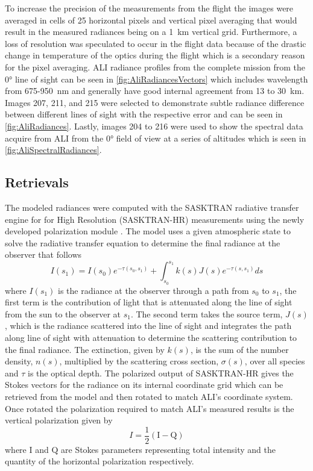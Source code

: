 \documentclass[12pt]{article}
\begin{document}
To increase the precision of the measurements from the flight the images were averaged in cells of 25 horizontal pixels and vertical pixel averaging that would result in the measured radiances being on a 1~km vertical grid. Furthermore, a loss of resolution was speculated to occur in the flight data because of the drastic change in temperature of the optics during the flight which is a secondary reason for the pixel averaging. ALI radiance profiles from the complete mission from the 0\si{\degree} line of sight can be seen in \autoref{fig:AliRadiancesVectors} which includes wavelength from 675-950~nm and generally have good internal agreement from 13 to 30~km. Images 207, 211, and 215 were selected to demonstrate subtle radiance difference between different lines of sight with the respective error and can be seen in \autoref{fig:AliRadiances}. Lastly, images 204 to 216 were used to show the spectral data acquire from ALI from the 0\si{\degree} field of view at a series of altitudes which is seen in \autoref{fig:AliSpectralRadiances}.

\subsection{Retrievals}
\label{sec:retrievals}

The modeled radiances were computed with the SASKTRAN radiative transfer engine \citep{Bourassa2008a} for for High Resolution (SASKTRAN-HR) \citep{Zawada2015} measurements using the newly developed polarization module \citep{Dueck2015}. The model uses a given atmospheric state to solve the radiative transfer equation to determine the final radiance at the observer that follows
\begin{equation}
    I(s_{1}) = I(s_{0})e^{-\tau(s_{0}, s_{1})}+\int^{s_{1}}_{s_{0}}k(s)J(s)e^{-\tau(s, s_{1})}ds
\end{equation}
where $I(s_{1})$ is the radiance at the observer through a path from $s_{0}$ to $s_{1}$, the first term is the contribution of light that is attenuated along the line of sight from the sun to the observer at $s_{1}$. The second term takes the source term, $J(s)$, which is the radiance scattered into the line of sight and integrates the path along line of sight with attenuation to determine the scattering contribution to the final radiance. The extinction, given by $k(s)$, is the sum of the number density, $n(s)$, multiplied by the scattering cross section, $\sigma(s)$, over all species and $\tau$ is the optical depth. The polarized output of SASKTRAN-HR gives the Stokes vectors for the radiance on its internal coordinate grid which can be retrieved from the model and then rotated to match ALI's coordinate system. Once rotated the polarization required to match ALI's measured results is the vertical polarization given by
\begin{equation}
    I = \frac{1}{2}\left(\mathrm{I}-\mathrm{Q}\right)
\end{equation}
where $\mathrm{I}$ and $\mathrm{Q}$ are Stokes parameters representing total intensity and the quantity of the horizontal polarization respectively.
\end{document}
